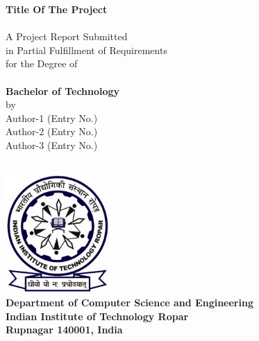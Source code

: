 \begin{titlepage}
\begin{center}

{\Huge \bfseries
Title Of The Project\\
}~\\[1cm]


{\large
A Project Report Submitted\\
in Partial Fulfillment of Requirements\\
for the Degree of\\
}~\\[0.20cm]

{\Large \bfseries
Bachelor of Technology
}\\[1.75cm]

{\large
by\\
Author-1 (Entry No.)\\
Author-2 (Entry No.)\\
Author-3 (Entry No.)\\
}~\\[1cm]

\vfill

\includegraphics[width=4cm]{Figures/IITRopar-Logo.jpg}~\\[1cm]

{\large \bfseries
Department of Computer Science and Engineering\\
Indian Institute of Technology Ropar\\
Rupnagar 140001, India\\
}

\end{center}
\end{titlepage}